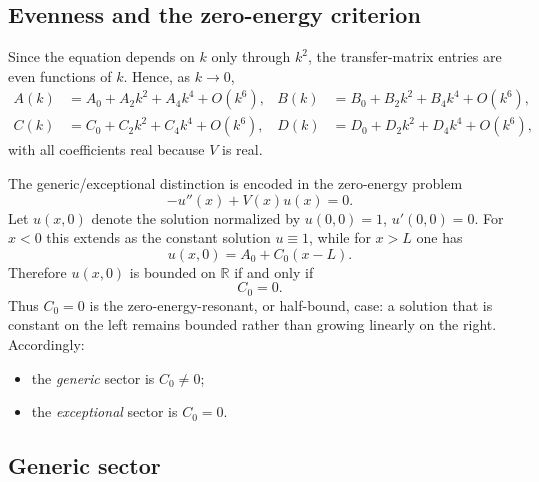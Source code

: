 \documentclass[aps,pra,preprint,notitlepage,nofootinbib]{revtex4-2}
\begin{document}
\subsection{Evenness and the zero-energy criterion}

Since the equation depends on $k$ only through $k^2$, the transfer-matrix entries are even functions of $k$. Hence, as $k\to0$,
\begin{align}
A(k)&=A_0+A_2k^2+A_4k^4+O(k^6), &
B(k)&=B_0+B_2k^2+B_4k^4+O(k^6), \nonumber\\
C(k)&=C_0+C_2k^2+C_4k^4+O(k^6), &
D(k)&=D_0+D_2k^2+D_4k^4+O(k^6),
\label{eq:abcd-even}
\end{align}
with all coefficients real because $V$ is real.

The generic/exceptional distinction is encoded in the zero-energy problem
\begin{equation}
-u''(x)+V(x)u(x)=0.
\label{eq:zero-energy-eq-app}
\end{equation}
Let $u(x,0)$ denote the solution normalized by $u(0,0)=1$, $u'(0,0)=0$. For $x<0$ this extends as the constant solution $u\equiv1$, while for $x>L$ one has
\begin{equation}
u(x,0)=A_0+C_0(x-L).
\label{eq:u-right-zero}
\end{equation}
Therefore $u(x,0)$ is bounded on $\mathbb R$ if and only if
\begin{equation}
C_0=0.
\label{eq:C0-criterion}
\end{equation}
Thus \(C_0=0\) is the zero-energy-resonant, or half-bound, case:
a solution that is constant on the left remains bounded rather than growing
linearly on the right. Accordingly:
\begin{itemize}
\item the \emph{generic} sector is $C_0\neq0$;
\item the \emph{exceptional} sector is $C_0=0$.
\end{itemize}

\subsection{Generic sector}
\end{document}

